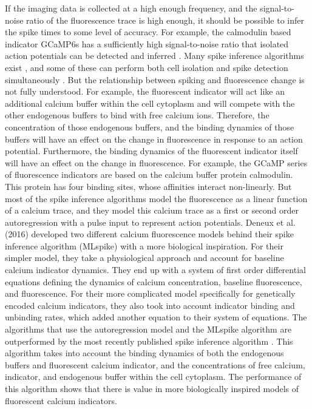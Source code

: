 If the imaging data is collected at a high enough frequency, and the signal-to-noise ratio of the fluorescence trace is high enough, it should be possible to infer the spike times to some level of accuracy. For example, the calmodulin based indicator GCaMP6s has a sufficiently high signal-to-noise ratio that isolated action potentials can be detected and inferred \parencite{chen}. Many spike inference algorithms exist \parencite{vogelstein, pnevmatikakis, friedrich, paninski1, paninski2, deneux, greenberg}, and some of these can perform both cell isolation and spike detection simultaneously \parencite{vogelstein, pnevmatikakis, paninski2, deneux}. But the relationship between spiking and fluorescence change is not fully understood. For example, the fluorescent indicator will act like an additional calcium buffer within the cell cytoplasm and will compete with the other endogenous buffers to bind with free calcium ions. Therefore, the concentration of those endogenous buffers, and the binding dynamics of those buffers will have an effect on the change in fluorescence in response to an action potential. Furthermore, the binding dynamics of the fluorescent indicator itself will have an effect on the change in fluorescence. For example, the GCaMP series of fluorescence indicators are based on the calcium buffer protein calmodulin. This protein has four binding sites, whose affinities interact non-linearly. But most of the spike inference algorithms model the fluorescence as a linear function of a calcium trace, and they model this calcium trace as a first or second order autoregression with a pulse input to represent action potentials. Deneux et al. (2016) developed two different calcium fluorescence models behind their spike inference algorithm (MLspike) with a more biological inspiration. For their simpler model, they take a physiological approach and account for baseline calcium indicator dynamics. They end up with a system of first order differential equations defining the dynamics of calcium concentration, baseline fluorescence, and fluorescence. For their more complicated model specifically for genetically encoded calcium indicators, they also took into account indicator binding and unbinding rates, which added another equation to their system of equations. The algorithms that use the autoregression model and the MLspike algorithm are outperformed by the most recently published spike inference algorithm \parencite{greenberg}. This algorithm takes into account the binding dynamics of both the endogenous buffers and fluorescent calcium indicator, and the concentrations of free calcium, indicator, and endogenous buffer within the cell cytoplasm. The performance of this algorithm shows that there is value in more biologically inspired models of fluorescent calcium indicators.

